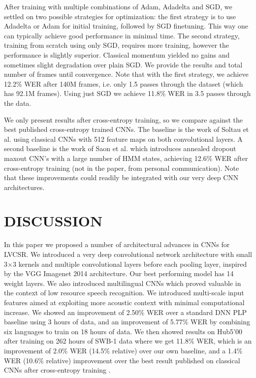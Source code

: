 \documentclass{article}
\begin{document}
After training with multiple combinations of Adam, Adadelta and SGD,
we settled on two possible strategies for optimization: the first strategy is to
use Adadelta or Adam for initial training,
followed by SGD finetuning. This way one can typically achieve good performance in minimal time.
The second strategy, training from scratch using only SGD, requires more training, 
however the performance is slightly superior.
Classical momentum yielded no gains and sometimes slight degradation over plain SGD.
We provide the results and total number of frames until convergence. 
Note that with the first strategy, we achieve 12.2\% WER
after 140M frames, i.e. only 1.5 passes through the dataset (which has 92.1M frames).
Using just SGD we achieve 11.8\% WER in 3.5 passes through the data.


We only present results after cross-entropy training, so we compare against
the best published cross-entropy trained CNNs.
The baseline is the work of Soltau et al. \cite{soltau2014joint} using
classical CNNs with 512 feature maps on both convolutional layers.
A second baseline is the work of Saon et al. \cite{saon2015ibm} which introduces
annealed dropout maxout CNN's with a large number of HMM states, achieving
12.6\% WER after cross-entropy training (not in the paper, from personal communication).
Note that these improvements could readily be integrated with our very deep CNN architectures.


\section{DISCUSSION}
In this paper we proposed a number of architectural advances in CNNs for LVCSR.
We introduced a very deep convolutional network architecture with small 3$\times$3 kernels
and multiple convolutional layers before each pooling layer, inspired by the VGG Imagenet 2014 architecture.
Our best performing model has 14 weight layers.
We also introduced multilingual CNNs which proved valuable in the context
of low resource speech recognition.
We introduced multi-scale input features aimed at exploiting more acoustic context
with minimal computational increase.
We showed an improvement of 2.50\% WER over a standard DNN PLP baseline using 3 hours of data,
and an improvement of 5.77\% WER by combining six languages to train on 18 hours of data.
We then showed results on Hub5'00 after training on 262 hours of SWB-1 data where we get 
11.8\% WER, which is
an improvement of 2.0\% WER (14.5\% relative) over our own baseline, and a 
1.4\% WER (10.6\% relative) improvement over the best
result published on classical CNNs after cross-entropy training \cite{soltau2014joint}.
\end{document}
